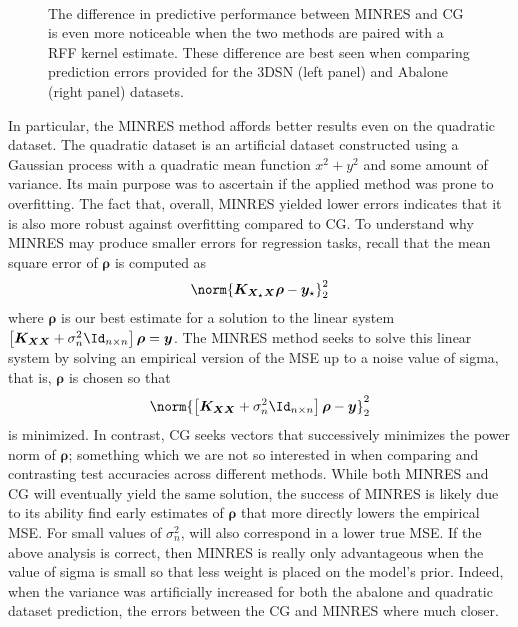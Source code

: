 \begin{figure}[ht]
    \centering
    \\
    \caption{The difference in predictive performance between MINRES and CG is even more noticeable when the two methods are paired with a RFF kernel estimate. These difference are best seen when comparing prediction errors provided for the 3DSN (left panel) and Abalone (right panel) datasets.}
    \label{fig: minres-vs-cg-rff}
\end{figure}
In particular, the MINRES method affords better results even on the quadratic dataset. The quadratic dataset is an artificial dataset constructed using a Gaussian process with a quadratic mean function $x^2 + y^2$ and some amount of variance. Its main purpose was to ascertain if the applied method was prone to overfitting. The fact that, overall, MINRES yielded lower errors indicates that it is also more robust against overfitting compared to CG. To understand why MINRES may produce smaller errors for regression tasks, recall that the mean square error of $\bm{\rho}$ is computed as
\begin{align*}
    \norm{\bm{K_{X_{\star} X}} \bm{\rho} - \bm{y}_{\star}}_2^2
\end{align*}
where $\bm{\rho}$ is our best estimate for a solution to the linear system $\left[ \bm{K_{XX}} + \sigma_n^2 \Id_{n \times n} \right] \bm{\rho} = \bm{y}$. The MINRES method seeks to solve this linear system by solving an empirical version of the MSE up to a noise value of sigma, that is, $\bm{\rho}$ is chosen so that
\begin{equation*}
    \norm{\left[ \bm{K_{XX}} + \sigma_n^2 \Id_{n \times n} \right] \bm{\rho} - \bm{y}}_2^2
\end{equation*}
is minimized. In contrast, CG seeks vectors that successively minimizes the power norm of $\bm{\rho}$; something which we are not so interested in when comparing and contrasting test accuracies across different methods. While both MINRES and CG will eventually yield the same solution, the success of MINRES is likely due to its ability find early estimates of $\bm{\rho}$ that more directly lowers the empirical MSE. For small values of $\sigma_n^2$, will also correspond in a lower true MSE. If the above analysis is correct, then MINRES is really only advantageous when the value of sigma is small so that less weight is placed on the model's prior. Indeed, when the variance was artificially increased for both the abalone and quadratic dataset prediction, the errors between the CG and MINRES where much closer.

